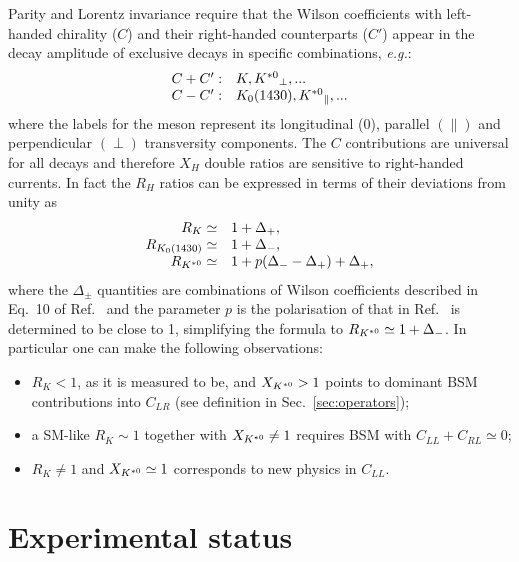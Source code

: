 Parity and Lorentz invariance require that the Wilson coefficients with left-handed chirality ($C$)
and their right-handed counterparts ($C'$) appear in the decay amplitude of exclusive decays in
specific combinations, \emph{e.g.}:
\begin{equation}
\begin{array}{ll}
C+C': & K, {{K}^{*0}}_{\perp}, ...  \\
C-C': & K_0(1430), {{K}^{*0}}_\parallel, ...
\end{array}
\end{equation}
where the labels for the \Kstarz meson represent its longitudinal (0), parallel $(\parallel)$ and
perpendicular $(\perp)$ transversity components. The $C$ contributions are universal for
all decays and therefore $X_H$ double ratios are sensitive to right-handed currents.
In fact the $R_H$ ratios can be expressed in terms of their deviations from unity as
\begin{equation}
\begin{array}{rl}
R_K \simeq 			& 1+ \Delta_+, 		\\
R_{K_0(1430)} \simeq 	& 1+ \Delta_-,		\\
R_{{{K}^{*0}}} \simeq 		& 1+ p(\Delta_- - \Delta_+) + \Delta_+,
\end{array}
\end{equation}
where the $\Delta_\pm$ quantities are combinations of Wilson coefficients
described in Eq.~10 of Ref.~\cite{Hiller:2014ula} and the parameter $p$ is the polarisation of \Kstarz
that in Ref.~\cite{Hiller:2014ula} is determined to be close to 1, simplifying the formula to $R_{{{K}^{*0}}} \simeq 1+ \Delta_-$.
In particular one can make the following observations: 
\begin{itemize}
\item $R_K < 1$, as it is measured to be, and $X_{{{K}^{*0}}} > 1$ points to dominant BSM contributions into $C_{LR}$ (see definition in Sec.~\ref{sec:operators});
\item a SM-like $R_K \sim 1$ together with $X_{{{K}^{*0}}} \neq 1$ requires BSM with $C_{LL} + C_{RL} \simeq 0$;
\item $R_K \neq 1$ and $X_{{{K}^{*0}}} \simeq 1$ corresponds to new physics in $C_{LL}$.
\end{itemize}

\section{Experimental status}

